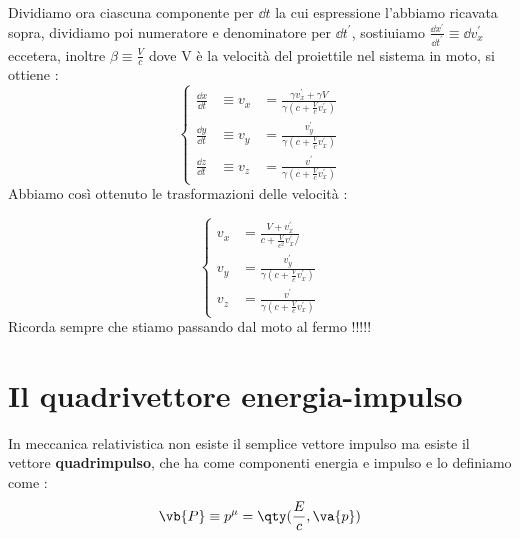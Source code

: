 \documentclass[a4paper, 12pt, twoside]{report}
\begin{document}
Dividiamo ora ciascuna componente per $\dd{t}$ la cui espressione l'abbiamo ricavata sopra, dividiamo poi numeratore e denominatore per $\dd{t^{\prime}}$, sostiuiamo $ \frac{\dd{x^{\prime}}}{\dd{t^{\prime}}} \equiv \dd{v^{\prime}_{x}} $ eccetera, inoltre $\beta \equiv \frac{V}{c}$ 
dove V è la velocità del proiettile nel sistema in moto, si ottiene : 
\newpage
\begin{equation*}
        \left\{ \begin{aligned}
                        \frac{\dd{x}}{\dd{t}} &\equiv v_{x}&= \frac{\gamma v^{\prime}_{x} + \gamma V}{\gamma(c + \frac{V}{c}v^{\prime}_{x})} \\
                        \frac{\dd{y}}{\dd{t}} &\equiv v_{y}&= \frac{v^{\prime}_{y}}{\gamma(c + \frac{V}{c}v^{\prime}_{x})} \\
                        \frac{\dd{z}}{\dd{t}} &\equiv v_{z}&= \frac{v^{\prime}}{\gamma(c + \frac{V}{c}v^{\prime}_{x})}
            \end{aligned}
            \right.
\end{equation*}
Abbiamo così ottenuto le trasformazioni delle velocità : 
\begin{tcolorbox}[colback=red!5!white,colframe=red!50!black,title=ATTENZIONE !]
        \begin{equation*}
                \left\{ \begin{aligned}
                                v_{x} &= \frac{V + v^{\prime}_{x}}{c + \frac{V}{c^{2}}v^{\prime}_{x}/}\\
                                v_{y} &= \frac{v^{\prime}_{y}}{\gamma(c + \frac{V}{c}v^{\prime}_{x})} \\
                                v_{z}&= \frac{v^{\prime}}{\gamma(c + \frac{V}{c}v^{\prime}_{x})}
                        \end{aligned}
                        \right.
        \end{equation*}
        Ricorda sempre che stiamo passando dal moto al fermo !!!!!
\end{tcolorbox}
\newpage

\chapter{Il quadrivettore energia-impulso}
In meccanica relativistica non esiste il semplice vettore impulso ma esiste il vettore \textbf{quadrimpulso}, che ha come componenti energia e impulso 
e lo definiamo come : 
\begin{align*}
        \vb{P} \equiv p^{\mu} = \qty(\frac{E}{c}, \va{p}) 
\end{align*}
\end{document}

